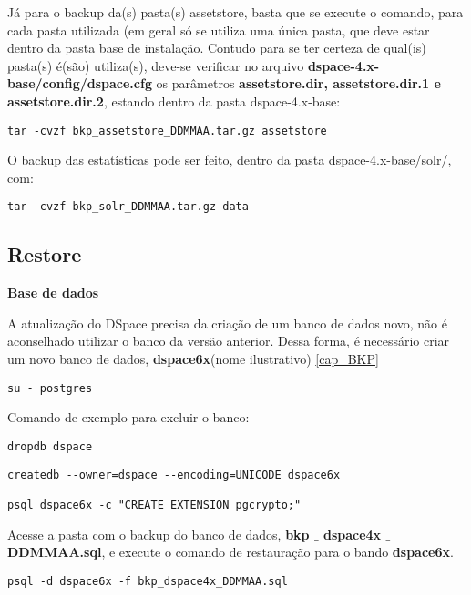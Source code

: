 \documentclass[12pt,hidelinks]{article}
\begin{document}
Já para o backup da(s) pasta(s) assetstore, basta que se execute o comando, para cada pasta utilizada (em geral só se utiliza uma única pasta, que deve estar dentro da pasta base de instalação. Contudo para se ter certeza de qual(is) pasta(s) é(são) utiliza(s), deve-se verificar no arquivo \textbf{dspace-4.x-base/config/dspace.cfg} os parâmetros \textbf{assetstore.dir, assetstore.dir.1 e assetstore.dir.2}, estando dentro da pasta dspace-4.x-base:   

\begin{verbatim}
tar -cvzf bkp_assetstore_DDMMAA.tar.gz assetstore
\end{verbatim}

O backup das estatísticas pode ser feito, dentro da pasta dspace-4.x-base/solr/, com:

\begin{verbatim}
tar -cvzf bkp_solr_DDMMAA.tar.gz data
\end{verbatim}

\subsection{Restore}

\textbf{Base de dados}
\singlespacing

A atualização do DSpace precisa da criação de um banco de dados novo, não é aconselhado utilizar o banco da versão anterior. Dessa forma, é necessário criar um novo banco de dados, \textbf{dspace6x}(nome ilustrativo) \ref{cap_BKP} 


\begin{verbatim}
su - postgres
\end{verbatim}

Comando de exemplo para excluir o banco:
\begin{verbatim}
dropdb dspace
\end{verbatim}

\begin{verbatim}
createdb --owner=dspace --encoding=UNICODE dspace6x

psql dspace6x -c "CREATE EXTENSION pgcrypto;"
\end{verbatim}

\newpage



Acesse a pasta com o backup do banco de dados, \textbf{bkp $\_$ dspace4x $\_$ DDMMAA.sql}, e execute o comando de restauração para o bando \textbf{dspace6x}.


\begin{verbatim}
psql -d dspace6x -f bkp_dspace4x_DDMMAA.sql
\end{verbatim}
\end{document}
